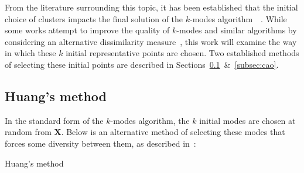 From the literature surrounding this topic, it has been established that the 
initial choice of clusters impacts the final solution of the \(k\)-modes
algorithm~\cite{Huang98}~\cite{Cao09}. While some works attempt to improve the 
quality of \(k\)-modes and similar algorithms by considering an alternative 
dissimilarity measure~\cite{Ng07}, this work will examine the way in which these
\(k\) initial representative points are chosen. Two established methods of 
selecting these initial points are described in
Sections~\ref{subsec:huang}~\&~\ref{subsec:cao}.\\


\subsection{Huang's method}\label{subsec:huang}

In the standard form of the \(k\)-modes algorithm, the \(k\) initial modes are 
chosen at random from \textbf{X}. Below is an alternative method of selecting
these modes that forces some diversity between them, as described 
in~\cite{Huang98}:\\

\begin{algorithm}[H]
\caption{Huang's method}\label{alg:huang}
    \begin{algorithmic}[0]
        \State{\(\bar{\mu} \gets \emptyset\)}
	        \EndFor
	        \EndFor
	    \EndFor
	        \EndFor
	    \EndFor
	    \EndFor
    \end{algorithmic}
\end{algorithm} 


